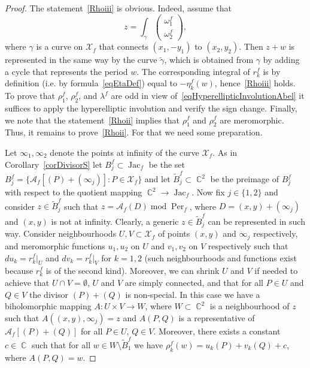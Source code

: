 \documentclass{amsart}
\numberwithin{equation}{section}
\theoremstyle{definition}
\theoremstyle{remark}
\DeclareMathOperator{\Jac}{Jac}
\DeclareMathOperator{\CC}{\mathbb C}
\DeclareMathOperator{\Per}{Per}
\begin{document}
	\begin{proof}
		The statement~\ref{Rhoiii} is obvious. Indeed, assume that \[
		z = \int_\gamma \begin{pmatrix}
			\omega_1^f \\ \omega_2^f
		\end{pmatrix},
		\]
		where $\gamma$ is a curve on $\mathcal X_f$ that connects $(x_1, -y_1)$ to $(x_2, y_2)$. Then $z + w$ is represented in the same way by the curve $\tilde \gamma$, which is obtained from $\gamma$ by adding a cycle that represents the period $w$. The corresponding integral of $r_k^f$ is by definition (i.e. by formula~\eqref{eqEtaDef}) equal to $-\eta_k^f(w)$, hence~\ref{Rhoiii} holds. To prove that $\rho_1^f$, $\rho_2^f$, and $\lambda^f$ are odd in view of~\eqref{eqHyperellipticInvolutionAbel} it suffices to apply the hyperelliptic involution and verify the sign change. Finally, we note that the statement~\ref{Rhoii} implies that $\rho_1^f$ and $\rho_2^f$ are meromorphic. Thus, it remains to prove~\ref{Rhoii}. For that we need some preparation.
		
		Let $\infty_1,\infty_2$ denote the points at infinity of the curve $\mathcal X_f$. As in Corollary~\ref{corDivisorS} let $B^f_j \subset \Jac_f$ be the set $B^f_j = \{\mathscr A_f[(P) + (\infty_j)]: P \in \mathcal X_f\}$ and let $\tilde B^f_j \subset \CC^2$ be the preimage of $B^f_j$ with respect to the quotient mapping $\CC^2 \to \Jac_f$. Now fix $j \in \{1,2\}$ and consider $z \in \tilde B_j^f$ such that $z = \mathscr A_f(D)\;\mathrm{mod}\;\Per_f$, where $D = (x,y) + (\infty_j)$ and $(x,y)$ is not at infinity. Clearly, a generic $z \in \tilde B_j^f$ can be represented in such way. Consider neighbourhoods $U, V \subset \mathcal X_f$ of points $(x,y)$ and $\infty_j$ respectively, and meromorphic functions $u_1,u_2$ on $U$ and $v_1,v_2$ on $V$ respectively such that $du_k = r_k^f|_U$ and $dv_k = r_k^f|_V$ for $k = 1,2$ (such neighbourhoods and functions exist because $r_k^f$ is of the second kind). Moreover, we can shrink $U$ and $V$ if needed to achieve that $U \cap V = \emptyset$, $U$ and $V$ are simply connected, and that for all $P \in U$ and $Q \in V$ the divisor $(P) + (Q)$ is non-special. In this case we have a biholomorphic mapping $A:U \times V \to W$, where $W \subset \CC^2$ is a neighbourhood of $z$ such that $A((x,y), \infty_j) = z$ and $A(P,Q)$ is a representative of $\mathscr A_f[(P) + (Q)]$ for all $P \in U$, $Q \in V$. Moreover, there exists a constant $c \in \CC$ such that for all $w \in W \setminus \tilde B_1^f$ we have $\rho_k^f(w) = u_k(P) + v_k(Q) + c$, where $A(P,Q) = w$. 
		

\end{proof}
\end{document}
